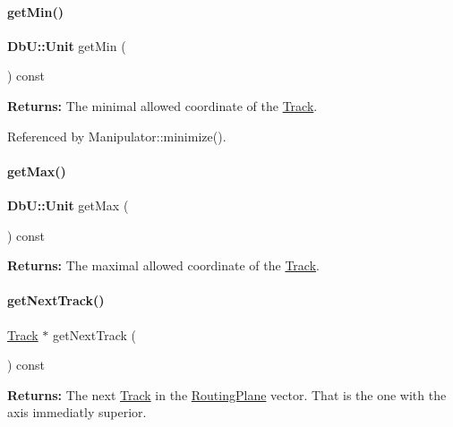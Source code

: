 \paragraph{\texorpdfstring{get\+Min()}{getMin()}}
{\footnotesize\ttfamily \textbf{ Db\+U\+::\+Unit} get\+Min (\begin{DoxyParamCaption}{ }\end{DoxyParamCaption}) const\hspace{0.3cm}{\ttfamily [inline]}}

{\bfseries Returns\+:} The minimal allowed coordinate of the \mbox{\hyperlink{classKite_1_1Track}{Track}}. 

Referenced by Manipulator\+::minimize().

\mbox{\label{classKite_1_1Track_a7fdc462696aede86c051edfaa6268e9a}} 
\paragraph{\texorpdfstring{get\+Max()}{getMax()}}
{\footnotesize\ttfamily \textbf{ Db\+U\+::\+Unit} get\+Max (\begin{DoxyParamCaption}{ }\end{DoxyParamCaption}) const\hspace{0.3cm}{\ttfamily [inline]}}

{\bfseries Returns\+:} The maximal allowed coordinate of the \mbox{\hyperlink{classKite_1_1Track}{Track}}. \mbox{\label{classKite_1_1Track_a1b8af68504f2de84cb85cf25e30f93bd}} 
\paragraph{\texorpdfstring{get\+Next\+Track()}{getNextTrack()}}
{\footnotesize\ttfamily \mbox{\hyperlink{classKite_1_1Track}{Track}} $\ast$ get\+Next\+Track (\begin{DoxyParamCaption}{ }\end{DoxyParamCaption}) const}

{\bfseries Returns\+:} The next \mbox{\hyperlink{classKite_1_1Track}{Track}} in the {\ttfamily \mbox{\hyperlink{classKite_1_1RoutingPlane}{Routing\+Plane}}} vector. That is the one with the axis immediatly superior. 

